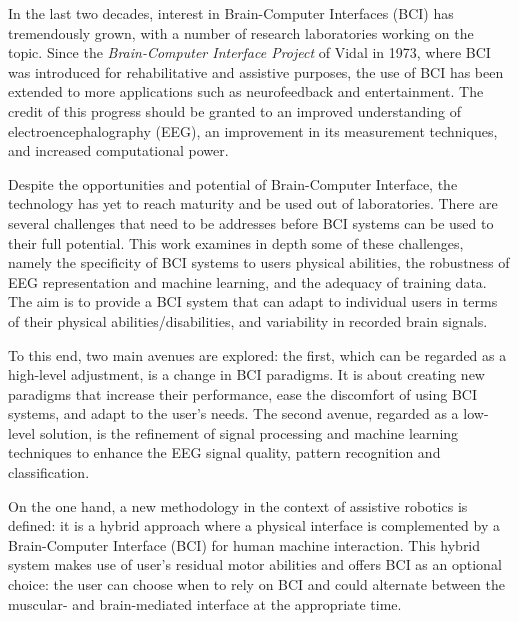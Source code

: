 


In the last two decades, interest in Brain-Computer Interfaces (BCI) has tremendously grown, with a number of research laboratories working on the topic. 
Since the \emph{Brain-Computer Interface Project} of Vidal in 1973, where BCI was introduced for rehabilitative and assistive purposes, the use of BCI has been extended to more applications such as neurofeedback and entertainment.
The credit of this progress should be granted to an improved understanding of electroencephalography (EEG), an improvement in its measurement techniques, and increased computational power. 

Despite the opportunities and potential of Brain-Computer Interface, the technology has yet to reach maturity and be used out of laboratories. 
There are several challenges that need to be addresses before BCI systems can be used to their full potential.
This work examines in depth some of these challenges, namely the specificity of BCI systems to users physical abilities, the robustness of EEG representation and machine learning, and the adequacy of training data.
The aim is to provide a BCI system that can adapt to individual users in terms of their physical abilities/disabilities, and variability in recorded brain signals. 

To this end, two main avenues are explored: the first, which can be regarded as a high-level adjustment, is a change in BCI paradigms. 
It is about creating new paradigms that increase their performance, ease the discomfort of using BCI systems, and adapt to the user's needs.
The second avenue, regarded as a low-level solution, is the refinement of signal processing and machine learning techniques to enhance the EEG signal quality, pattern recognition and classification.   

On the one hand, a new methodology in the context of assistive robotics is defined: it is a hybrid approach where a physical interface is complemented by a Brain-Computer Interface (BCI) for human machine interaction.
This hybrid system makes use of user’s residual motor abilities and offers BCI as an optional choice: the user can choose when to rely on BCI and could alternate between the muscular- and brain-mediated interface at the appropriate time. 
 
